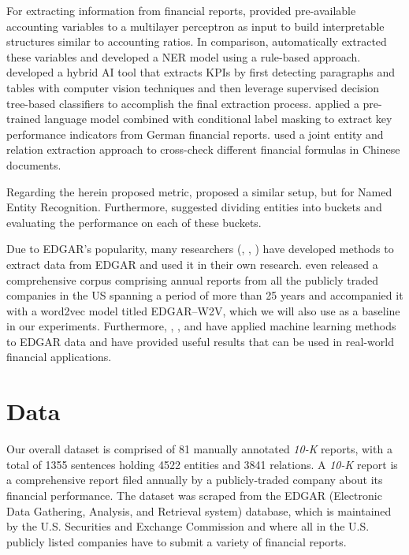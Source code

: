 \documentclass[conference, table]{IEEEtran}
\newcommand{\1} {\mathbbm{1}}
\begin{document}
For extracting information from financial reports, \cite{treigueiros1991application} provided pre-available accounting variables to a multilayer perceptron as input to build interpretable structures similar to accounting ratios. In comparison, \cite{farmakiotou2000rule} automatically extracted these variables and developed a NER model using a rule-based approach. \cite{brito2019hybrid} developed a hybrid AI tool that extracts KPIs by first detecting paragraphs and tables with computer vision techniques and then leverage supervised decision tree-based classifiers to accomplish the final extraction process.
 \cite{kpi-bert} applied a pre-trained language model combined with conditional label masking to extract key performance indicators from German financial reports. \cite{cao2018towards} used a joint entity and relation extraction approach to cross-check different financial formulas in Chinese documents.

Regarding the herein proposed metric, \cite{segura2013semeval} proposed a similar setup, but for Named Entity Recognition. Furthermore, \cite{fu2020interpretable} suggested dividing entities into buckets and evaluating the performance on each of these buckets.

Due to EDGAR's popularity, many researchers (\cite{han2016mining}, \cite{ashraf2017scraping}, \cite{lonare2021edgar}) have developed methods to extract data from EDGAR and used it in their own research. \cite{loukas2021edgar} even released a comprehensive corpus comprising annual reports from all the publicly traded companies in the US spanning a period of more than 25 years and accompanied it with a word2vec \cite{word2vec} model titled EDGAR--W2V, which we will also use as a baseline in our experiments. Furthermore, \cite{mustafaoglu2022lstm}, \cite{ryans2021textual}, and \cite{li2010information} have applied machine learning methods to EDGAR data and have provided useful results that can be used in real-world financial applications.

\section{Data}

Our overall dataset is comprised of 81 manually annotated \textit{10-K} reports, with a total of 1355 sentences holding 4522 entities and 3841 relations. A \textit{10-K} report is a comprehensive report filed annually by a publicly-traded company about its financial performance. The dataset was scraped from the EDGAR (Electronic Data Gathering, Analysis, and Retrieval system) database, which is maintained by the U.S. Securities and Exchange Commission and where all in the U.S. publicly listed companies have to submit a variety of financial reports.
\end{document}
